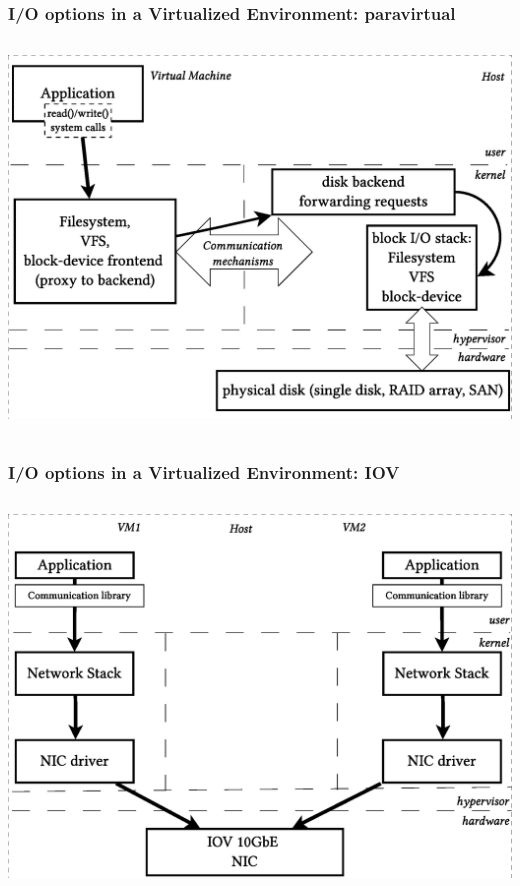 \documentclass[red,slidestop,notes,compress,mathserif]{beamer}
\begin{document}
\begin{frame}
\frametitle{I/O options in a Virtualized Environment: paravirtual}
\begin{columns}
\includegraphics[width=\textwidth]{figs/bare/io_paravirt.eps}
\end{columns}
\end{frame}

\begin{frame}
\frametitle{I/O options in a Virtualized Environment: IOV}
\begin{columns}
\includegraphics[width=\textwidth]{figs/bare/io_iov.eps}
\end{columns}
\end{frame}
\end{document}
